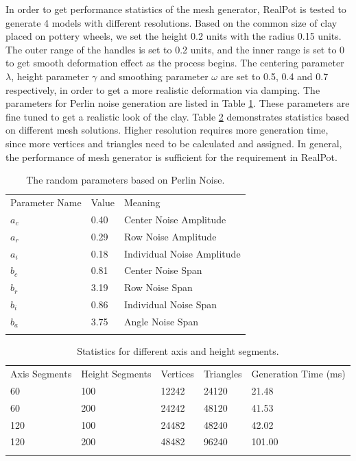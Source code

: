 \documentclass{svjour3}                     %
\begin{document}
In order to get performance statistics of the mesh generator, RealPot is tested to generate 4 models with different resolutions.
Based on the common size of clay placed on pottery wheels, we set the height 0.2 units with the radius 0.15 units.
The outer range of the handles is set to 0.2 units, and the inner range is set to 0 to get smooth deformation effect as the process begins. The centering parameter $\lambda$, height parameter $\gamma$ and smoothing parameter $\omega$ are set to 0.5, 0.4 and 0.7 respectively, in order to get a more realistic deformation via damping. The parameters for Perlin noise generation are listed in Table \ref{tab:1}. These parameters are fine tuned to get a realistic look of the clay.
Table \ref{tab:2} demonstrates statistics based on different mesh solutions. Higher resolution requires more generation time, since more vertices and triangles need to be calculated and assigned. In general, the performance of mesh generator is sufficient for the requirement in RealPot.

\begin{table}
\caption{The random parameters based on Perlin Noise.}
\label{tab:1}       %
\begin{tabular}{lll}
\hline\noalign{\smallskip}
Parameter Name & Value & Meaning  \\
\noalign{\smallskip}\hline\noalign{\smallskip}
$a_{c}$ & 0.40 & Center Noise Amplitude \\
$a_{r}$ & 0.29 & Row Noise Amplitude \\
$a_{i}$ & 0.18 & Individual Noise Amplitude \\
$b_{c}$ & 0.81 & Center Noise Span \\
$b_{r}$ & 3.19 & Row Noise Span \\
$b_{i}$ & 0.86 & Individual Noise Span \\
$b_{a}$ & 3.75 & Angle Noise Span \\
\noalign{\smallskip}\hline
\end{tabular}
\end{table}

\begin{table}
\caption{Statistics for different axis and height segments.}
\label{tab:2}       %
\begin{tabular}{lllll}
\hline\noalign{\smallskip}
Axis Segments & Height Segments & Vertices & Triangles & Generation Time (ms)\\
\noalign{\smallskip}\hline\noalign{\smallskip}
60 & 100 & 12242 & 24120 & 21.48 \\
60 & 200 & 24242 & 48120 & 41.53 \\
120 & 100 & 24482 & 48240 & 42.02 \\
120 & 200 & 48482 & 96240 & 101.00 \\
\noalign{\smallskip}\hline
\end{tabular}
\end{table}
\end{document}
